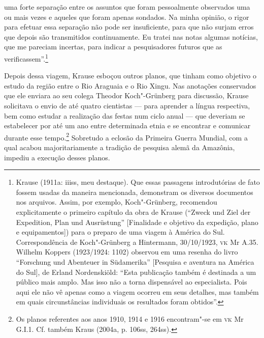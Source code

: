 uma forte separação entre os assuntos que foram pessoalmente observados
uma ou mais vezes e aqueles que foram apenas sondados. Na minha opinião,
o rigor para efetuar essa separação não pode ser insuficiente, para que
não surjam erros que depois são transmitidos continuamente. Eu tratei
nas notas algumas notícias, que me pareciam incertas, para indicar a
pesquisadores futuros que as verificassem''.\footnote{Krause (1911a:
  iiiss, meu destaque). Que essas passagens introdutórias de fato fossem
  usadas da maneira mencionada, demonstram os diversos documentos nos
  arquivos. Assim, por exemplo, Koch"-Grünberg, recomendou
  explicitamente o primeiro capítulo da obra de Krause (``Zweck und Ziel
  der Expedition, Plan und Ausrüstung'' {[}Finalidade e objetivo da
  expedição, plano e equipamentos{]}) para o preparo de uma viagem à
  América do Sul. Correspondência de Koch"-Grünberg a Hintermann,
  30/10/1923, \textsc{vk} Mr A.35. Wilhelm Koppers (1923/1924: 1102) observou em
  uma resenha do livro ``Forschung und Abenteuer in Südamerika''
  {[}Pesquisa e aventura na América do Sul{]}, de Erland Nordenskiöld:
  ``Esta publicação também é destinada a um público mais amplo. Mas isso
  não a torna dispensável ao especialista. Pois aqui ele não vê apenas
  como a viagem ocorreu em seus detalhes, mas também em quais
  circunstâncias individuais os resultados foram obtidos''.}

Depois dessa viagem, Krause esboçou outros planos, que tinham como
objetivo o estudo da região entre o Rio Araguaia e o Rio Xingu. Nas
anotações conservados que ele enviara ao seu colega Theodor
Koch"-Grünberg para discussão, Krause solicitava o envio de até quatro
cientistas --- para aprender a língua respectiva, bem como estudar a
realização das festas num ciclo anual --- que deveriam se estabelecer por
até um ano entre determinada etnia e se encontrar e comunicar durante
esse tempo.\footnote{Os planos referentes aos anos 1910, 1914 e 1916
  encontram"-se em \textsc{vk} Mr G.I.1. Cf. também Kraus (2004a, p. 106ss,
  264ss).} Sobretudo a eclosão da Primeira Guerra Mundial, com a qual
acabou majoritariamente a tradição de pesquisa alemã da Amazônia,
impediu a execução desses planos.

